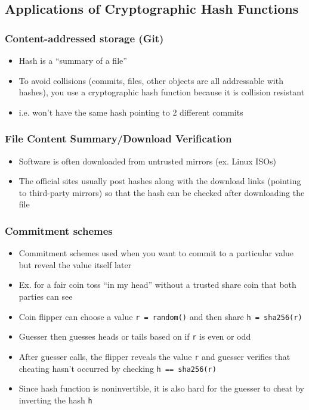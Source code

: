 \documentclass[letterpaper,12pt]{article}
\begin{document}
\subsection{Applications of Cryptographic Hash Functions}
\subsubsection{Content-addressed storage (Git)}
\begin{itemize}
 \item Hash is a ``summary of a file''
 \item To avoid collisions (commits, files, other objects are all addressable with hashes), you use a cryptographic hash function because it is collision resistant
 \item i.e. won't have the same hash pointing to 2 different commits
\end{itemize}

\subsubsection{File Content Summary/Download Verification}
\begin{itemize}
 \item Software is often downloaded from untrusted mirrors (ex. Linux ISOs)
 \item The official sites usually post hashes along with the download links (pointing to third-party mirrors) so that the hash can be checked after downloading the file
\end{itemize}

\subsubsection{Commitment schemes}
\begin{itemize}
 \item Commitment schemes used when you want to commit to a particular value but reveal the value itself later
 \item Ex. for a fair coin toss ``in my head'' without a trusted share coin that both parties can see
 \item Coin flipper can choose a value \lstinline{r = random()} and then share \lstinline{h = sha256(r)}
 \item Guesser then guesses heads or tails based on if \lstinline{r} is even or odd
 \item After guesser calls, the flipper reveals the value \lstinline{r} and guesser verifies that cheating hasn't occurred by checking \lstinline{h == sha256(r)}
 \item Since hash function is noninvertible, it is also hard for the guesser to cheat by inverting the hash \lstinline{h}
\end{itemize}
\end{document}

